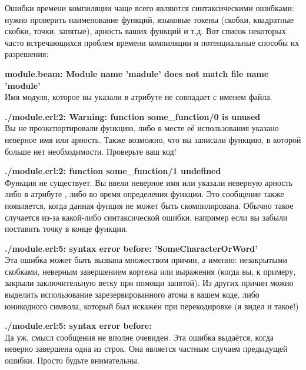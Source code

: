 Ошибки времени компиляции чаще всего являются синтаксическими ошибками: нужно проверить наименование функций, языковые токены (скобки, квадратные скобки, точки, запятые), арность ваших функций и т.д. Вот список некоторых часто встречающихся проблем времени компиляции и потенциальные способы их разрешения:

\blankline
\begin{minipage}{\textwidth}
\textbf{module.beam: Module name 'madule' does not match file name 'module'}\\
Имя модуля, которое вы указали в атрибуте  не совпадает с именем файла.
\end{minipage}

\blankline
\begin{minipage}{\textwidth}
\textbf{./module.erl:2: Warning: function some\_function/0 is unused}\\ 
Вы не проэкспортировали функцию, либо в месте её использования указано неверное имя или арность. Также возможно, что вы записали функцию, в которой больше нет необходимости. Проверьте ваш код!
\end{minipage}

\blankline
\begin{minipage}{\textwidth}
\textbf{./module.erl:2: function some\_function/1 undefined}\\ 
Функция не существует. Вы ввели неверное имя или указали неверную арность либо в атрибуте , либо во время определения функции. Это сообщение также появляется, когда данная фунция не может быть скомпилирована. Обычно такое случается из\--за какой\--либо синтаксической ошибки, например если вы забыли поставить точку в конце функции.
\end{minipage}

\blankline
\begin{minipage}{\textwidth}
\textbf{./module.erl:5: syntax error before: 'SomeCharacterOrWord'}\\ 
Эта ошибка может быть вызвана множеством причин, а именно: незакрытыми скобками, неверным завершением кортежа или выражения (когда вы, к примеру, закрыли заключительную ветку  при помощи запятой). Из других причин можно выделить использование зарезервированного атома в вашем коде, либо юникодного символа, который был искажён при перекодировке (я видел и такое!)
\end{minipage}

\blankline
\begin{minipage}{\textwidth}
\textbf{./module.erl:5: syntax error before: }\\ 
Да уж, смысл сообщения не вполне очевиден. Эта ошибка выдаётся, когда неверно завершена одна из строк. Она является частным случаем предыдущей ошибки. Просто будьте внимательны.
\end{minipage}

